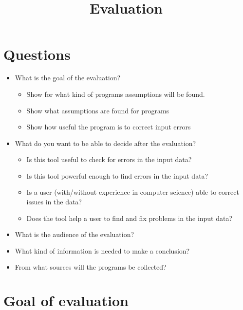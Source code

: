 \documentclass[11pt]{article}
\begin{document}
\title{Evaluation}

\maketitle


\section{Questions}


\begin{itemize}
  \item What is the goal of the evaluation?
  \begin{itemize}
    \item Show for what kind of programs assumptions will be found.
    \item Show what assumptions are found for programs
    \item Show how useful the program is to correct input errors
  \end{itemize}
  \item What do you want to be able to decide after the evaluation?
  \begin{itemize}
    \item Is this tool useful to check for errors in the input data?
    \item Is this tool powerful enough to find errors in the input data?
    \item Is a user (with/without experience in computer science) able to correct issues in the data?
    \item Does the tool help a user to find and fix problems in the input data?
  \end{itemize}
  \item What is the audience of the evaluation?
  \item What kind of information is needed to make a conclusion?
  \item From what sources will the programs be collected?
\end{itemize}

\section{Goal of evaluation}
\end{document}
